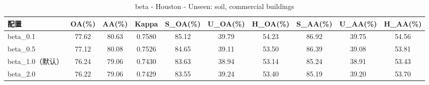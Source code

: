 \begin{table}[htbp]
\centering
\caption{beta - Houston - Unseen: soil, commercial buildings}
\begin{tabular}{lccccccccc}
\hline
配置 & OA(\%) & AA(\%) & Kappa & S\_OA(\%) & U\_OA(\%) & H\_OA(\%) & S\_AA(\%) & U\_AA(\%) & H\_AA(\%) \\
\hline
beta_0.1 & 77.62 & 80.63 & 0.7580 & 85.12 & 39.79 & 54.23 & 86.92 & 39.75 & 54.56 \\
beta_0.5 & 77.12 & 80.08 & 0.7526 & 84.65 & 39.11 & 53.50 & 86.39 & 39.08 & 53.81 \\
beta_1.0（默认） & 76.24 & 79.06 & 0.7430 & 83.63 & 38.94 & 53.14 & 85.24 & 38.91 & 53.43 \\
beta_2.0 & 76.22 & 79.06 & 0.7429 & 83.55 & 39.24 & 53.40 & 85.19 & 39.20 & 53.70 \\
\hline
\end{tabular}
\end{table}